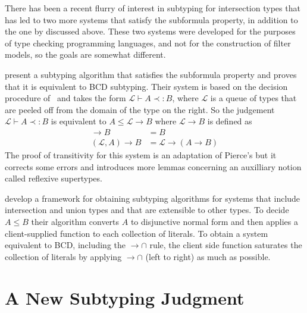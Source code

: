 \documentclass{article}
\begin{document}
There has been a recent flurry of interest in subtyping for
intersection types that has led to two more systems that satisfy the
subformula property, in addition to the one by \citet{Laurent:2018aa}
discussed above. These two systems were developed for the purposes of
type checking programming languages, and not for the construction of
filter models, so the goals are somewhat different.

\citet{Bi:2018aa} present a subtyping algorithm that satisfies the
subformula property and proves that it is equivalent to BCD
subtyping. Their system is based on the decision procedure
of~\citet{Pierce:1989aa} and takes the form $\mathcal{L} \vdash A
\prec: B$, where $\mathcal{L}$ is a queue of types that are peeled off
from the domain of the type on the right. So the judgement
$\mathcal{L} \vdash A \prec: B$ is equivalent to $A \leq \mathcal{L}
\to B$ where $\mathcal{L} \to B$ is defined as
\begin{align*}
  [] \to B &= B\\
  (\mathcal{L},A) \to B &= \mathcal{L} \to (A \to B)
\end{align*}
The proof of transitivity for this system is an adaptation of Pierce's
but it corrects some errors and introduces more lemmas concerning an
auxilliary notion called reflexive supertypes.

\citet{Muehlboeck:2018aa} develop a framework for obtaining subtyping
algorithms for systems that include intersection and union types and
that are extensible to other types. To decide $A \leq B$ their
algorithm converts $A$ to disjunctive normal form and then applies a
client-supplied function to each collection of literals. To obtain a
system equivalent to BCD, including the ${\to}{\cap}$ rule, the client
side function saturates the collection of literals by applying
${\to}{\cap}$ (left to right) as much as possible.

    

\section{A New Subtyping Judgment}
\label{sec:new-subtyping}
\end{document}

